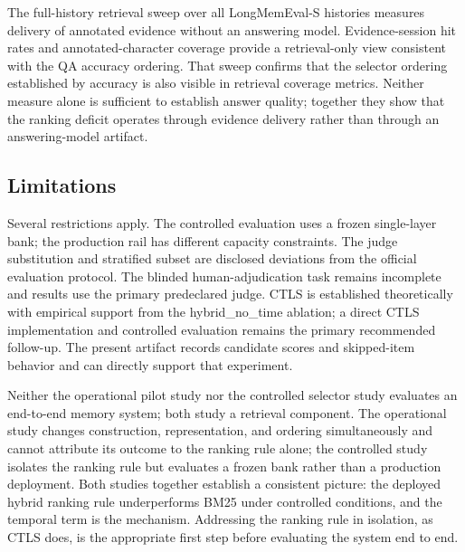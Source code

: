 The full-history retrieval sweep over all LongMemEval-S histories measures delivery of annotated evidence without an answering model. Evidence-session hit rates and annotated-character coverage provide a retrieval-only view consistent with the QA accuracy ordering. That sweep confirms that the selector ordering established by accuracy is also visible in retrieval coverage metrics. Neither measure alone is sufficient to establish answer quality; together they show that the ranking deficit operates through evidence delivery rather than through an answering-model artifact.

\subsection{Limitations}

Several restrictions apply. The controlled evaluation uses a frozen single-layer bank; the production rail has different capacity constraints. The judge substitution and stratified subset are disclosed deviations from the official evaluation protocol. The blinded human-adjudication task remains incomplete and results use the primary predeclared judge. CTLS is established theoretically with empirical support from the hybrid\_no\_time ablation; a direct CTLS implementation and controlled evaluation remains the primary recommended follow-up. The present artifact records candidate scores and skipped-item behavior and can directly support that experiment.

Neither the operational pilot study nor the controlled selector study evaluates an end-to-end memory system; both study a retrieval component. The operational study changes construction, representation, and ordering simultaneously and cannot attribute its outcome to the ranking rule alone; the controlled study isolates the ranking rule but evaluates a frozen bank rather than a production deployment. Both studies together establish a consistent picture: the deployed hybrid ranking rule underperforms BM25 under controlled conditions, and the temporal term is the mechanism. Addressing the ranking rule in isolation, as CTLS does, is the appropriate first step before evaluating the system end to end.

